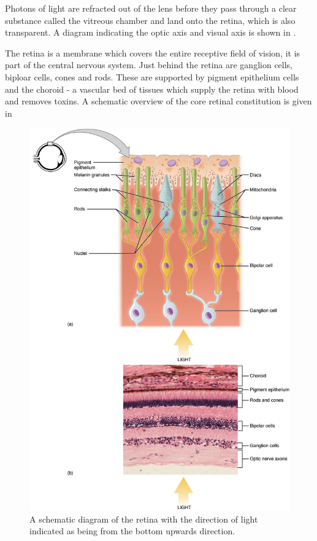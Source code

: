 Photons of light are refracted out of the lens before they pass through
a clear substance called the vitreous chamber and land onto the retina,
which is also transparent. A diagram indicating the optic axis and
visual axis is shown in .

The retina is a membrane which covers the entire receptive field of
vision, it is part of the central nervous system.\cite{rogers1983neurite}
Just behind the retina are ganglion cells, biploar cells, cones and rods.
These are supported by pigment epithelium cells and the choroid - a
vascular bed of tissues which supply the retina with blood and removes
toxins. \cite{lutty1996localization} A schematic overview of the core
retinal constitution is given in 

\begin{figure}[htbp]
\centering
  \includegraphics{figures/rods_and_cones}
\caption{A schematic diagram of the retina with the direction of light indicated
as being from the bottom upwards direction.}
\label{fig:retina}
\end{figure}


